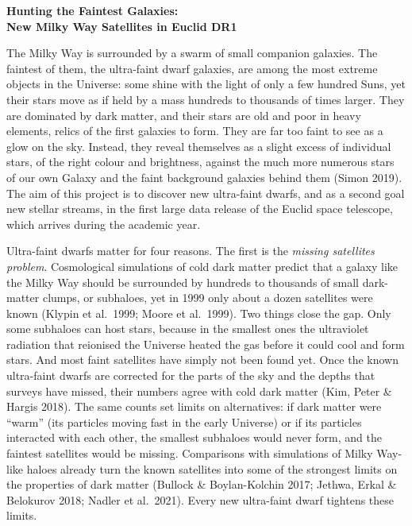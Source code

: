 \documentclass[11pt,a4paper]{article}
\begin{document}
\begin{center}
{\LARGE\bfseries Hunting the Faintest Galaxies:\\[0.3em] New Milky Way Satellites in Euclid DR1}
\end{center}
\vspace{0.5em}

The Milky Way is surrounded by a swarm of small companion galaxies. The faintest of them, the ultra-faint dwarf galaxies, are among the most extreme objects in the Universe: some shine with the light of only a few hundred Suns, yet their stars move as if held by a mass hundreds to thousands of times larger. They are dominated by dark matter, and their stars are old and poor in heavy elements, relics of the first galaxies to form. They are far too faint to see as a glow on the sky. Instead, they reveal themselves as a slight excess of individual stars, of the right colour and brightness, against the much more numerous stars of our own Galaxy and the faint background galaxies behind them (Simon 2019). The aim of this project is to discover new ultra-faint dwarfs, and as a second goal new stellar streams, in the first large data release of the Euclid space telescope, which arrives during the academic year.

Ultra-faint dwarfs matter for four reasons. The first is the \emph{missing satellites problem}. Cosmological simulations of cold dark matter predict that a galaxy like the Milky Way should be surrounded by hundreds to thousands of small dark-matter clumps, or subhaloes, yet in 1999 only about a dozen satellites were known (Klypin et al.\ 1999; Moore et al.\ 1999). Two things close the gap. Only some subhaloes can host stars, because in the smallest ones the ultraviolet radiation that reionised the Universe heated the gas before it could cool and form stars. And most faint satellites have simply not been found yet. Once the known ultra-faint dwarfs are corrected for the parts of the sky and the depths that surveys have missed, their numbers agree with cold dark matter (Kim, Peter \& Hargis 2018). The same counts set limits on alternatives: if dark matter were ``warm'' (its particles moving fast in the early Universe) or if its particles interacted with each other, the smallest subhaloes would never form, and the faintest satellites would be missing. Comparisons with simulations of Milky Way-like haloes already turn the known satellites into some of the strongest limits on the properties of dark matter (Bullock \& Boylan-Kolchin 2017; Jethwa, Erkal \& Belokurov 2018; Nadler et al.\ 2021). Every new ultra-faint dwarf tightens these limits.
\end{document}
